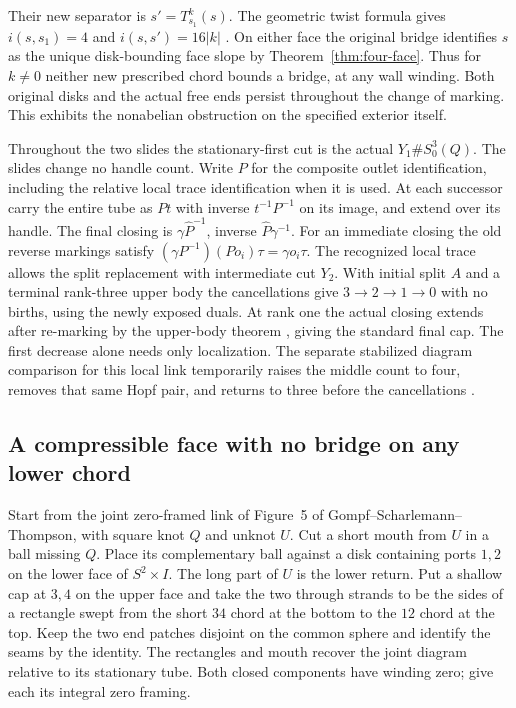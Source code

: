 \documentclass[11pt,letterpaper]{article}
\numberwithin{equation}{section}
\theoremstyle{remark}
\begin{document}
Their new separator is \(s'=T_{s_1}^k(s)\). The geometric twist
formula gives \(i(s,s_1)=4\) and \(i(s,s')=16\lvert k\rvert\)
\cite[Proposition 3.2]{FarbMargalit2012Primer}. On either face
the original bridge identifies \(s\) as the unique disk-bounding
face slope by Theorem~\ref{thm:four-face}. Thus for \(k\ne0\)
neither new prescribed chord bounds a bridge, at any wall winding.
Both original disks and the actual free ends persist throughout the
change of marking. This exhibits the nonabelian obstruction on the
specified exterior itself.

Throughout the two slides the stationary-first cut is the actual
\(Y_1\# S^3_0(Q)\). The slides change no handle count. Write \(P\)
for the composite outlet identification, including the relative local
trace identification when it is used. At each successor carry the
entire tube as \(Pt\) with inverse \(t^{-1}P^{-1}\) on its image,
and extend over its handle. The final closing is
\(\gamma\widehat P^{-1}\), inverse \(\widehat P\gamma^{-1}\).
For an immediate closing the old reverse markings satisfy
\((\gamma P^{-1})(Po_i)\tau=\gamma o_i\tau\).
The recognized local trace allows the split replacement with
intermediate cut \(Y_2\). With initial split \(A\) and a terminal
rank-three upper body the cancellations give \(3\to2\to1\to0\)
with no births, using the newly exposed duals. At rank one the actual
closing extends after re-marking by the upper-body theorem
\cite{LaudenbachPoenaru1972Handlebodies}, giving the standard final cap. The first decrease
alone needs only localization. The separate stabilized diagram
comparison for this local link temporarily raises the middle count
to four, removes that same Hopf pair, and returns to three before
the cancellations \cite[\S10]{GompfScharlemannThompson2010}.

\subsection{A compressible face with no bridge on any lower chord}
\label{sec:whitehead-returns}

Start from the joint zero-framed link of Figure~5 of
Gompf--Scharlemann--Thompson, with square knot \(Q\) and unknot \(U\).
Cut a short mouth from \(U\) in a ball missing \(Q\). Place its
complementary ball against a disk containing ports \(1,2\) on the
lower face of \(S^2\times I\). The long part of \(U\) is the lower
return. Put a shallow cap at \(3,4\) on the upper face and take the
two through strands to be the sides of a rectangle swept from the
short \(34\) chord at the bottom to the \(12\) chord at the top.
Keep the two end patches disjoint on the common sphere and identify
the seams by the identity. The rectangles and mouth recover the
joint diagram relative to its stationary tube. Both closed components
have winding zero; give each its integral zero framing.
\end{document}
